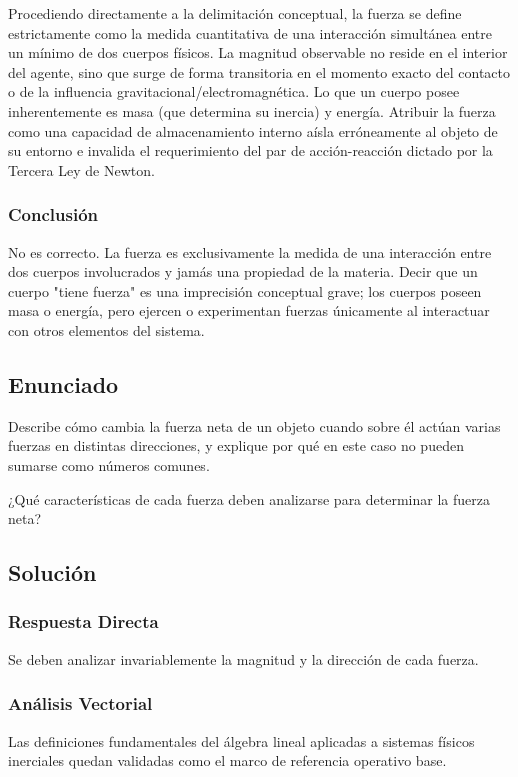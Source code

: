 \documentclass[12pt, a4paper]{article}
\begin{document}
Procediendo directamente a la delimitación conceptual, la fuerza se define estrictamente como la medida cuantitativa de una interacción simultánea entre un mínimo de dos cuerpos físicos. La magnitud observable no reside en el interior del agente, sino que surge de forma transitoria en el momento exacto del contacto o de la influencia gravitacional/electromagnética. Lo que un cuerpo posee inherentemente es masa (que determina su inercia) y energía. Atribuir la fuerza como una capacidad de almacenamiento interno aísla erróneamente al objeto de su entorno e invalida el requerimiento del par de acción-reacción dictado por la Tercera Ley de Newton.

\subsubsection*{Conclusión}
No es correcto. La fuerza es exclusivamente la medida de una interacción entre dos cuerpos involucrados y jamás una propiedad de la materia. Decir que un cuerpo "tiene fuerza" es una imprecisión conceptual grave; los cuerpos poseen masa o energía, pero ejercen o experimentan fuerzas únicamente al interactuar con otros elementos del sistema.

\newpage
\subsection*{Enunciado}
Describe cómo cambia la fuerza neta de un objeto cuando sobre él actúan varias fuerzas en distintas direcciones, y explique por qué en este caso no pueden sumarse como números comunes. 

¿Qué características de cada fuerza deben analizarse para determinar la fuerza neta?

\subsection*{Solución}

\subsubsection*{Respuesta Directa}
Se deben analizar invariablemente la magnitud y la dirección de cada fuerza.

\subsubsection*{Análisis Vectorial}
Las definiciones fundamentales del álgebra lineal aplicadas a sistemas físicos inerciales quedan validadas como el marco de referencia operativo base. 
\end{document}
